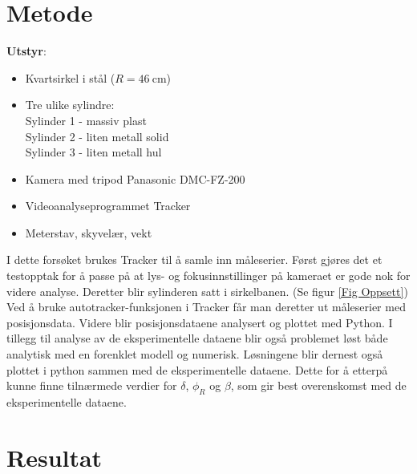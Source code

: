 \documentclass[5p]{elsarticle}
\newcommand{\enhet}[1]{~\mathrm{#1}}  %
\begin{document}
\newpage
\section{Metode}
\noindent\textbf{Utstyr}:
\begin{itemize}
	\item Kvartsirkel i stål (\(R = 46 \enhet{cm}\))
	\item Tre ulike sylindre:
	\\ Sylinder 1 - massiv plast
	\\ Sylinder 2 - liten metall solid 
	\\ Sylinder 3 - liten metall hul
	\item Kamera med tripod Panasonic DMC-FZ-200
	\item Videoanalyseprogrammet Tracker
	\item Meterstav, skyvelær, vekt
\end{itemize}

I dette forsøket brukes Tracker til å samle inn måleserier. 
Først gjøres det et testopptak for å passe på at lys- og fokusinnstillinger på kameraet er gode nok for videre analyse.
Deretter blir sylinderen satt i sirkelbanen. (Se figur \ref{Fig Oppsett})
Ved å bruke autotracker-funksjonen i Tracker får man deretter ut måleserier med posisjonsdata.
Videre blir posisjonsdataene analysert og plottet med Python. 
I tillegg til analyse av de eksperimentelle dataene blir også problemet løst både analytisk med en forenklet modell og numerisk. Løsningene blir dernest også plottet i python sammen med de eksperimentelle dataene. Dette for å etterpå kunne finne tilnærmede verdier for $\delta$, $\phi_R$ og $\beta$, som gir best overenskomst med de eksperimentelle dataene.

\section{Resultat}
\end{document}
